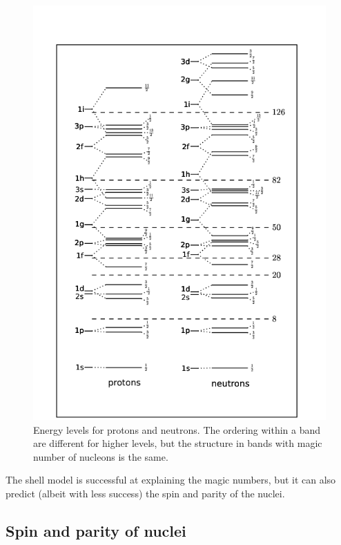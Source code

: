 \documentclass[12pt]{article}
\begin{document}
\begin{figure}
\begin{center}
\includegraphics[scale=0.5]{images/Shell.png}
\caption{Energy levels for protons and neutrons. The ordering within a band are different for higher levels, but the structure in bands with magic number of nucleons is the same.}\label{fig:pnlevels}
\end{center}
\end{figure}

The shell model is successful at explaining the magic numbers, but it can also predict (albeit with less success) the spin and parity of the nuclei. 
\subsection{Spin and parity of nuclei}
\end{document}
